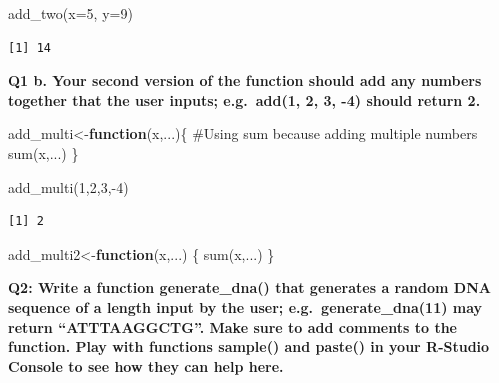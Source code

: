 \documentclass[
  letterpaper,
  DIV=11,
  numbers=noendperiod]{scrartcl}
\newenvironment{Shaded}{\begin{snugshade}}{\end{snugshade}}
\newcommand{\AttributeTok}[1]{\textcolor[rgb]{0.40,0.45,0.13}{#1}}
\newcommand{\CommentTok}[1]{\textcolor[rgb]{0.37,0.37,0.37}{#1}}
\newcommand{\ControlFlowTok}[1]{\textcolor[rgb]{0.00,0.23,0.31}{\textbf{#1}}}
\newcommand{\DecValTok}[1]{\textcolor[rgb]{0.68,0.00,0.00}{#1}}
\newcommand{\FunctionTok}[1]{\textcolor[rgb]{0.28,0.35,0.67}{#1}}
\newcommand{\NormalTok}[1]{\textcolor[rgb]{0.00,0.23,0.31}{#1}}
\newcommand{\OtherTok}[1]{\textcolor[rgb]{0.00,0.23,0.31}{#1}}
\newcommand{\SpecialCharTok}[1]{\textcolor[rgb]{0.37,0.37,0.37}{#1}}
\begin{document}
\begin{Shaded}
\begin{Highlighting}[]
\FunctionTok{add\_two}\NormalTok{(}\AttributeTok{x=}\DecValTok{5}\NormalTok{, }\AttributeTok{y=}\DecValTok{9}\NormalTok{)}
\end{Highlighting}
\end{Shaded}

\begin{verbatim}
[1] 14
\end{verbatim}

\textbf{Q1 b. Your second version of the function should add any numbers
together that the user inputs; e.g.~add(1, 2, 3, -4) should return 2.}

\begin{Shaded}
\begin{Highlighting}[]
\NormalTok{add\_multi}\OtherTok{\textless{}{-}}\ControlFlowTok{function}\NormalTok{(x,...)\{}
  \CommentTok{\#Using sum because adding multiple numbers }
  \FunctionTok{sum}\NormalTok{(x,...)}
\NormalTok{\}}

\FunctionTok{add\_multi}\NormalTok{(}\DecValTok{1}\NormalTok{,}\DecValTok{2}\NormalTok{,}\DecValTok{3}\NormalTok{,}\SpecialCharTok{{-}}\DecValTok{4}\NormalTok{)}
\end{Highlighting}
\end{Shaded}

\begin{verbatim}
[1] 2
\end{verbatim}

\begin{Shaded}
\begin{Highlighting}[]
\NormalTok{add\_multi2}\OtherTok{\textless{}{-}}\ControlFlowTok{function}\NormalTok{(x,...) \{}
  \FunctionTok{sum}\NormalTok{(x,...)}
\NormalTok{\}}
\end{Highlighting}
\end{Shaded}

\textbf{Q2: Write a function generate\_dna() that generates a random DNA
sequence of a length input by the user; e.g.~generate\_dna(11) may
return ``ATTTAAGGCTG''. Make sure to add comments to the function. Play
with functions sample() and paste() in your R-Studio Console to see how
they can help here.}
\end{document}
